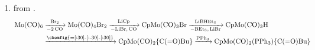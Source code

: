 \documentclass[../psets.tex]{subfiles}
\begin{document}
\begin{enumerate}
\begin{enumerate}
\begin{proof}[Answer]
            \begin{equation*}
                \ce{$\frac{1}{2}$ Mn2(CO)10 ->[$\frac{1}{2}$Br2] Mn(CO)5Br ->[LiPh][-LiBr] PhMn(CO)5}
            \end{equation*}
        \end{proof}
        \item {} from .
        \begin{align*}
            \ce{Mo(CO)6} &\ce{->[Br2][-2CO]} \ce{Mo(CO)4Br2 ->[LiCp][-LiBr,CO] CpMo(CO)3Br ->[LiBHEt3][-BEt3, LiBr] CpMo(CO)3H}\\
            &\ce{->[\chemfig{=[:30]-[:-30]-[:30]}]} \ce{CpMo(CO)2\{C(=O)Bu\} ->[PPh3] CpMo(CO)2(PPh3)\{C(=O)Bu\}}
        \end{align*}
    

\end{enumerate}
\end{enumerate}
\end{document}
